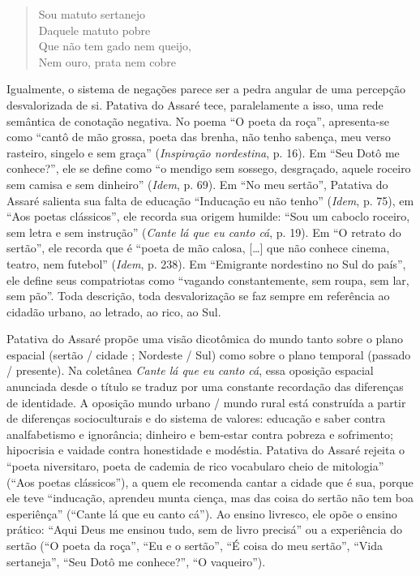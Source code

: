\begin{verse}
Sou matuto sertanejo\\
Daquele matuto pobre\\
Que não tem gado nem queijo,\\
Nem ouro, prata nem cobre
\end{verse}

Igualmente, o sistema de negações parece ser a pedra angular de uma percepção
desvalorizada de si. Patativa do Assaré tece, paralelamente a isso, uma rede
semântica de conotação negativa. No poema “O poeta da roça”, apresenta-se como
“cantô de mão grossa, poeta das brenha, não tenho sabença, meu verso rasteiro,
singelo e sem graça” (\textit{Inspiração nordestina}, p. 16). Em “Seu Dotô me conhece?”, ele se define como
“o mendigo sem sossego, desgraçado, aquele roceiro sem camisa e sem dinheiro”
(\textit{Idem}, p. 69). Em “No meu sertão”, Patativa do Assaré salienta sua falta de
educação “Inducação eu não tenho” (\textit{Idem}, p. 75), em “Aos poetas clássicos”, ele
recorda sua origem humilde: “Sou um caboclo roceiro, sem letra e sem instrução”
(\textit{Cante lá que eu canto cá}, p. 19). Em “O retrato do sertão”, ele recorda que é “poeta de mão calosa,
[\ldots{}] que não conhece cinema, teatro, nem futebol” (\textit{Idem}, p. 238). Em
“Emigrante nordestino no Sul do país”, ele define seus compatriotas como
“vagando constantemente, sem roupa, sem lar, sem pão”. Toda descrição, toda
desvalorização se faz sempre em referência ao cidadão urbano, ao letrado, ao
rico, ao Sul.

Patativa do Assaré propõe uma visão dicotômica do mundo tanto sobre o plano
espacial (sertão / cidade ; Nordeste / Sul) como sobre o plano temporal (passado
/ presente). Na coletânea \textit{Cante lá que eu canto cá}, essa oposição espacial
anunciada desde o título se traduz por uma constante recordação das diferenças
de identidade. A oposição mundo urbano / mundo rural está construída a partir de
diferenças socioculturais e do sistema de valores: educação e saber contra
analfabetismo e ignorância; dinheiro e bem-estar contra pobreza e sofrimento;
hipocrisia e vaidade contra honestidade e modéstia. Patativa do Assaré rejeita o
“poeta niversitaro, poeta de cademia de rico vocabularo cheio de mitologia”
(“Aos poetas clássicos”), a quem ele recomenda cantar a cidade que é sua, porque
ele teve “inducação, aprendeu munta ciença, mas das coisa do sertão não tem boa
esperiênça” (“Cante lá que eu canto cá”). Ao ensino livresco, ele opõe o ensino
prático: “Aqui Deus me ensinou tudo, sem de livro precisá” ou a experiência do
sertão (“O poeta da roça”, “Eu e o sertão”, “É coisa do meu sertão”, “Vida
sertaneja”, “Seu Dotô me conhece?”, “O vaqueiro”).

